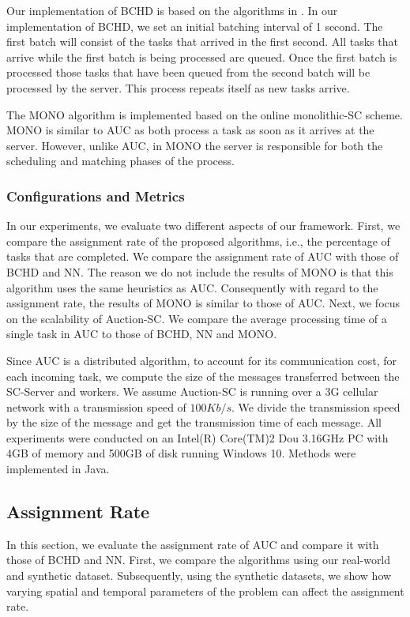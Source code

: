 Our implementation of BCHD is based on the algorithms in \cite{Deng15}. In our implementation of BCHD, we set an initial batching interval of 1 second. The first batch will consist of the tasks that arrived in the first second. All tasks that arrive while the first batch is being processed are queued. Once the first batch is processed those tasks that have been queued from the second batch will be processed by the server. This process repeats itself as new tasks arrive.

The MONO algorithm is implemented based on the online monolithic-SC scheme. MONO is similar to AUC as both process a task as soon as it arrives at the server. However, unlike AUC, in MONO the server is responsible for both the scheduling and matching phases of the process.
\vspace{-0.2in}
\subsubsection{Configurations and Metrics}
In our experiments, we evaluate two different aspects of our framework. First, we compare the assignment rate of the proposed algorithms, i.e., the percentage of tasks that are completed. We compare the assignment rate of AUC with those of BCHD and NN. The reason we do not include the results of MONO is that this algorithm uses the same heuristics as AUC. Consequently with regard to the assignment rate, the results of MONO is similar to those of AUC. Next, we focus on the scalability of Auction-SC. We compare the average processing time of a single task in AUC to those of BCHD, NN and MONO.

Since AUC is a distributed algorithm, to account for its communication cost, for each incoming task, we compute the size of the messages transferred between the SC-Server and workers. We assume Auction-SC is running over a 3G cellular network with a transmission speed of $100 Kb/s$. We divide the transmission speed by the size of the message and get the transmission time of each message. All experiments were conducted on an Intel(R) Core(TM)2 Dou 3.16GHz PC with 4GB of memory and 500GB of disk running Windows 10. Methods were implemented in Java.

\vspace{-0.05in}
\subsection{Assignment Rate}
\vspace{-0.05in}
In this section, we evaluate the assignment rate of AUC and compare it with those of BCHD and NN. First, we compare the algorithms using our real-world and synthetic dataset. Subsequently, using the synthetic datasets, we show how varying spatial and temporal parameters of the problem can affect the assignment rate.

